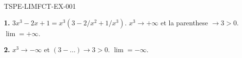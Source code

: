 \begin{corrige}{TSPE-LIMFCT-EX-001}


\textbf{1.} $3x^3 - 2x + 1 = x^3(3 - 2/x^2 + 1/x^3)$. $x^3 \to +\infty$ et la parenthese $\to 3 > 0$. $\boxed{\lim = +\infty}$.

\textbf{2.} $x^3 \to -\infty$ et $(3 - \ldots) \to 3 > 0$. $\boxed{\lim = -\infty}$.

\end{corrige}

